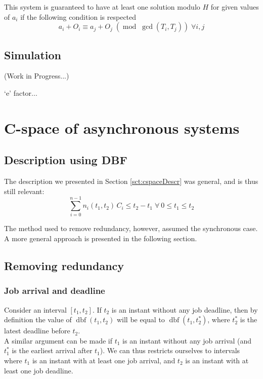 \documentclass[times, 10pt,twocolumn, a4paper]{article}
\newcommand{\dbf}[1]{\operatorname{dbf}(#1)}
\begin{document}
This system is guaranteed to have at least one solution modulo $H$ for given values of $a_i$ if the following condition is respected $$a_i + O_i \equiv a_j + O_j \; (\operatorname{mod} \; \operatorname{gcd}(T_i, T_j)) \; \forall i, j$$

  \subsection{Simulation}

  (Work in Progress...)

  `e' factor...

\section{C-space of asynchronous systems}
  \label{sct:asyncCspace}

  \subsection{Description using DBF}

  The description we presented in Section \ref{sct:cspaceDescr} was general, and is thus still relevant: $$\sum_{i=0}^{n-1} n_i(t_1, t_2) \, C_i \leq t_2 - t_1 \; \forall \: 0 \leq t_1 \leq t_2$$

  The method used to remove redundancy, however, assumed the synchronous case. A more general approach is presented in the following section.

  \subsection{Removing redundancy}

\subsubsection{Job arrival and deadline}

Consider an interval $[t_1, t_2]$. If $t_2$ is an instant without any job deadline, then by definition the value of $\dbf{t_1, t_2}$ will be equal to $\dbf{t_1, t_2^*}$, where $t_2^*$ is the latest deadline before $t_2$.\\

A similar argument can be made if $t_1$ is an instant without any job arrival (and $t_1^*$ is the earliest arrival after $t_1$). We can thus restricts ourselves to intervals where $t_1$ is an instant with at least one job arrival, and $t_2$ is an instant with at least one job deadline.
\end{document}
